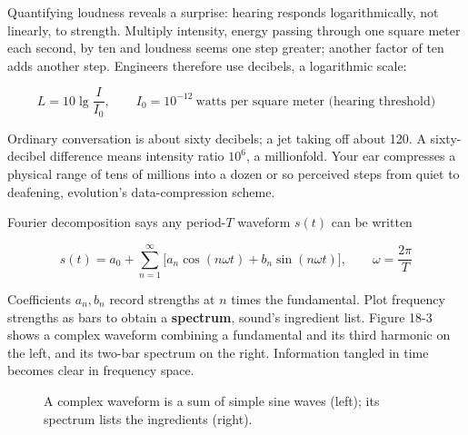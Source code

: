 \begin{mathbridge}
Quantifying loudness reveals a surprise: hearing responds logarithmically, not linearly, to strength. Multiply intensity, energy passing through one square meter each second, by ten and loudness seems one step greater; another factor of ten adds another step. Engineers therefore use decibels, a logarithmic scale:

\[
  L = 10\lg\frac{I}{I_0},
  \qquad I_0 = 10^{-12}\ \text{watts per square meter (hearing threshold)}
\]

Ordinary conversation is about sixty decibels; a jet taking off about 120. A sixty-decibel difference means intensity ratio \(10^6\), a millionfold. Your ear compresses a physical range of tens of millions into a dozen or so perceived steps from quiet to deafening, evolution's data-compression scheme.

Fourier decomposition says any period-\(T\) waveform \(s(t)\) can be written

\[
  s(t) = a_0 + \sum_{n=1}^{\infty}\bigl[a_n\cos(n\omega t) + b_n\sin(n\omega t)\bigr],
  \qquad \omega = \frac{2\pi}{T}
\]

Coefficients \(a_n, b_n\) record strengths at \(n\) times the fundamental. Plot frequency strengths as bars to obtain a \textbf{spectrum}, sound's ingredient list. Figure 18-3 shows a complex waveform combining a fundamental and its third harmonic on the left, and its two-bar spectrum on the right. Information tangled in time becomes clear in frequency space.
\end{mathbridge}

\begin{figure}[htbp]
\centering
{}
\caption{A complex waveform is a sum of simple sine waves (left); its spectrum lists the ingredients (right).}
\end{figure}

